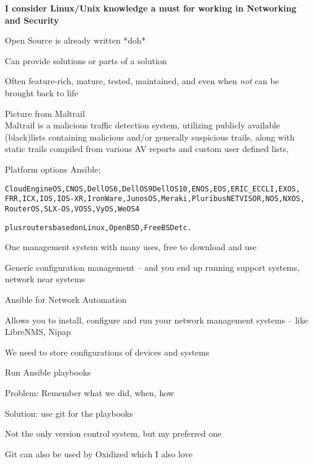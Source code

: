 \documentclass[Screen16to9,17pt]{foils}
\begin{document}
{\bf I consider Linux/Unix knowledge a must for working in Networking and Security}



\begin{list2}
\item Open Source is already written *doh*
\item Can provide solutions or parts of a solution
\item Often feature-rich, mature, tested, maintained, and even when \emph{not} can be brought back to life
\item Picture from Maltrail \\
Maltrail is a malicious traffic detection system, utilizing publicly available (black)lists containing malicious and/or generally suspicious trails, along with static trails compiled from various AV reports and custom user defined lists,
\end{list2}






Platform options Ansible:
\begin{alltt}
CloudEngine OS, CNOS, Dell OS6, Dell OS9 Dell OS10, ENOS, EOS, ERIC_ECCLI, EXOS,
FRR, ICX, IOS, IOS-XR, IronWare, Junos OS, Meraki, Pluribus NETVISOR, NOS, NXOS,
RouterOS, SLX-OS, VOSS, VyOS, WeOS 4

plus routers based on Linux, OpenBSD, FreeBSD etc.
\end{alltt}


One management system with many uses, free to download and use
\begin{list2}
\item Generic configuration management -- and you end up running support systems, network near systems
\item Ansible for Network Automation\\
\item Allows you to install, configure and run your network management systems -- like LibreNMS, Nipap
\end{list2}



\begin{list2}
\item We need to store configurations of devices and systems
\item Run Ansible playbooks
\item Problem: Remember what we did, when, how
\item Solution: use git for the playbooks
\item Not the only version control system, but my preferred one
\item Git can also be used by Oxidized which I also love 
\end{list2}
\end{document}
